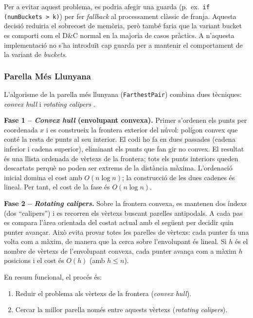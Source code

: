\documentclass[conference,compsoc]{IEEEtran}
\begin{document}
Per a evitar aquest problema, es podria afegir una guarda
(p.~ex.\ \texttt{if (numBuckets > k)}) per fer \textit{fallback} al
processament clàssic de franja. Aquesta decisió reduiria el sobrecost
de memòria, però també faria que la variant bucket es comporti com el
D\&C normal en la majoria de casos pràctics. A n'aquesta implementació no s'ha
introduït cap guarda per a mantenir el comportament de la variant de \textit{buckets}.

\subsubsection{Parella Més Llunyana}

L'algorisme de la parella més llunyana (\texttt{FarthestPair})
combina dues tècniques: \textit{convex hull} i
\textit{rotating calipers} \cite{ref_gfg_convex}.

\textbf{Fase 1 -- \textit{Convex hull} (envolupant convexa).}
Primer s'ordenen els punts per coordenada $x$ i es construeix la
frontera exterior del núvol: polígon convex que conté la resta de punts al seu interior.
El codi ho fa en dues
passades (cadena inferior i cadena superior), eliminant els punts que
fan gir no convex. El resultat és una llista ordenada de vèrtexs de la
frontera; tots els punts interiors queden descartats perquè no poden ser
extrems de la distància màxima. L'ordenació inicial domina el cost
amb $O(n\log n)$; la construcció de les dues cadenes és lineal. Per tant,
el cost de la fase és $O(n\log n)$.

\textbf{Fase 2 -- \textit{Rotating calipers}.}
Sobre la frontera convexa, es mantenen dos índexs (dos ``calipers'') i
es recorren els vèrtexs buscant parelles antipodals. A cada pas es
compara l'àrea orientada del costat actual amb el següent per decidir
quin punter avançar. Això evita provar totes les parelles de vèrtexs:
cada punter fa una volta com a màxim, de manera que la cerca sobre
l'envolupant és lineal. Si $h$ és el nombre de vèrtexs de
l'envolupant convexa, cada punter avança com a màxim $h$ posicions i el
cost és $O(h)$ (amb $h\leq n$).

En resum funcional, el procés és:
\begin{enumerate}
    \item Reduir el problema als vèrtexs de la frontera (\textit{convex hull}).
    \item Cercar la millor parella només entre aquests vèrtexs
          (\textit{rotating calipers}).
\end{enumerate}
\end{document}
